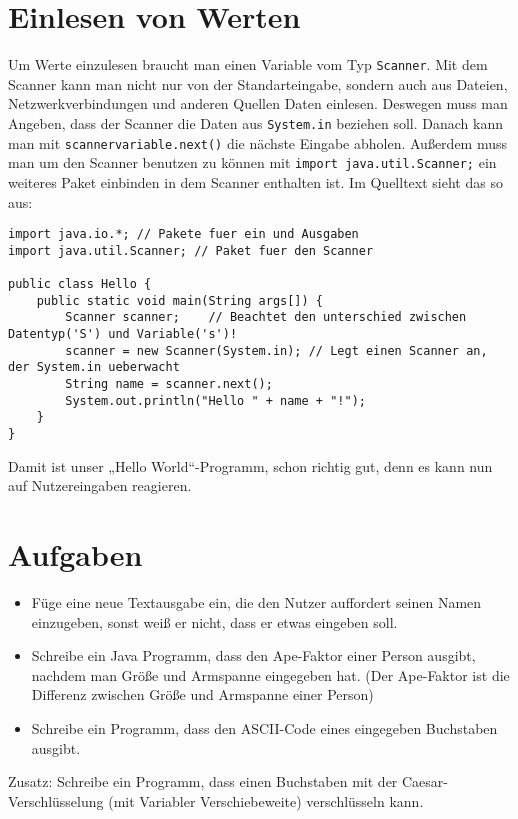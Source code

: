 \section {Einlesen von Werten}
Um Werte einzulesen braucht man einen Variable vom Typ \lstinline$Scanner$. Mit dem Scanner kann man nicht nur von der Standarteingabe, sondern auch aus Dateien, Netzwerkverbindungen und anderen Quellen Daten einlesen. 
Deswegen muss man Angeben, dass der Scanner die Daten aus \lstinline$System.in$ beziehen soll.
Danach kann man mit \lstinline$scannervariable.next()$ die nächste Eingabe abholen.
Außerdem muss man um den Scanner benutzen zu können mit \lstinline$import java.util.Scanner;$ ein weiteres Paket einbinden in dem Scanner enthalten ist.
Im Quelltext sieht das so aus:
\begin{lstlisting}
import java.io.*; // Pakete fuer ein und Ausgaben
import java.util.Scanner; // Paket fuer den Scanner

public class Hello {
	public static void main(String args[]) {
		Scanner scanner;	// Beachtet den unterschied zwischen Datentyp('S') und Variable('s')!
		scanner = new Scanner(System.in); // Legt einen Scanner an, der System.in ueberwacht
		String name = scanner.next();
		System.out.println("Hello " + name + "!");
	}
}
\end{lstlisting}
Damit ist unser „Hello World“-Programm, schon richtig gut, denn es kann nun auf Nutzereingaben reagieren.

\section {Aufgaben}
\begin{itemize}
\item Füge eine neue Textausgabe ein, die den Nutzer auffordert seinen Namen einzugeben, sonst weiß er nicht, dass er etwas eingeben soll.
\item Schreibe ein Java Programm, dass den Ape-Faktor einer Person ausgibt, nachdem man Größe und Armspanne eingegeben hat. (Der Ape-Faktor ist die Differenz zwischen Größe und Armspanne einer Person)
\item Schreibe ein Programm, dass den ASCII-Code eines eingegeben Buchstaben ausgibt.
\end{itemize}

Zusatz: Schreibe ein Programm, dass einen Buchstaben mit der Caesar-Verschlüsselung (mit Variabler Verschiebeweite) verschlüsseln kann.
